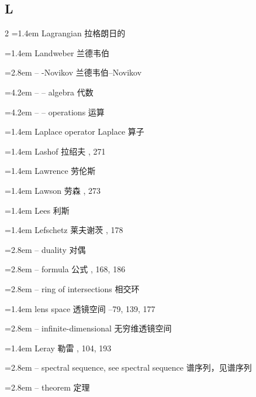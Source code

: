 \subsection*{L}
\small
\begin{multicols}{2}
\noindent\hangindent=1.4em Lagrangian \quad 拉格朗日的 \par
\noindent\hangindent=1.4em Landweber \quad 兰德韦伯 \par
\noindent\hangindent=2.8em -- -Novikov \quad 兰德韦伯--Novikov \quad\par
\noindent\hangindent=4.2em -- -- algebra \quad 代数 \par
\noindent\hangindent=4.2em -- -- operations \quad 运算 \par
\noindent\hangindent=1.4em Laplace operator \quad Laplace 算子 \par
\noindent\hangindent=1.4em Lashof \quad 拉绍夫 , 271\par
\noindent\hangindent=1.4em Lawrence \quad 劳伦斯 \par
\noindent\hangindent=1.4em Lawson \quad 劳森 , 273\par
\noindent\hangindent=1.4em Lees \quad 利斯 \par
\noindent\hangindent=1.4em Lefschetz \quad 莱夫谢茨 , 178\par
\noindent\hangindent=2.8em -- duality \quad 对偶 \par
\noindent\hangindent=2.8em -- formula \quad 公式 , 168, 186\par
\noindent\hangindent=2.8em -- ring of intersections \quad 相交环 \par
\noindent\hangindent=1.4em lens space \quad 透镜空间 --79, 139, 177\par
\noindent\hangindent=2.8em -- infinite-dimensional \quad 无穷维透镜空间 \par
\noindent\hangindent=1.4em Leray \quad 勒雷 , 104, 193\par
\noindent\hangindent=2.8em -- spectral sequence, see spectral sequence \quad 谱序列，见谱序列 \quad\par
\noindent\hangindent=2.8em -- theorem \quad 定理 \par

\end{multicols}

